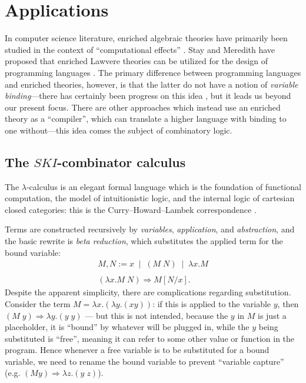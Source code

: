 \documentclass{amsart}
\theoremstyle{definition}
\begin{document}
\section{Applications}
\label{sec:applications}

In computer science literature, enriched algebraic theories have primarily been studied in the context of ``computational effects'' \cite{compeffects}.   Stay and Meredith have proposed that enriched Lawvere theories can be utilized for the design of programming languages \cite{ladl}. The primary difference between programming languages and enriched theories, however, is that the latter do not have a notion of \textit{variable binding}---there has certainly been progress on this idea \cite{fiore}, but it leads us beyond our present focus. There are other approaches which instead use an enriched theory as a ``compiler'', which can translate a higher language with binding to one without---this idea comes the
subject of combinatory logic.

\subsection{The $SKI$-combinator calculus}
\label{ssec:SKI}

The $\lambda$-calculus is an elegant formal language which is the foundation of functional computation, the model of intuitionistic logic, and the internal logic of cartesian closed categories: this is the Curry--Howard--Lambek correspondence \cite{baezstay}.

Terms are constructed recursively by \textit{variables}, \textit{application}, and \textit{abstraction}, and the basic rewrite is \textit{beta reduction}, which substitutes the applied term for the bound variable: 
\[ \begin{array}{l}
     M,N := x \;\; | \;\; (M\; N) \;\; | \;\; \lambda x.M\\\\
     (\lambda x.M\; N) \Rightarrow M[N/x].
     \end{array}\]
Despite the apparent simplicity, there are complications regarding substitution. Consider the term $M = \lambda x.(\lambda y.(xy))$: if this is applied to the variable $y$, then $(M\; y) \Rightarrow \lambda y.(y\; y)$ --- but this is not intended, because the $y$ in $M$ is just a placeholder, it is ``bound'' by whatever will be plugged in, while the $y$ being substituted is ``free'', meaning it can refer to some other value or function in the program. Hence whenever a free variable is to be substituted for a bound variable, we need to rename the bound variable to prevent ``variable capture'' (e.g. $(M y) \Rightarrow \lambda z.(y\; z)$).
\end{document}
